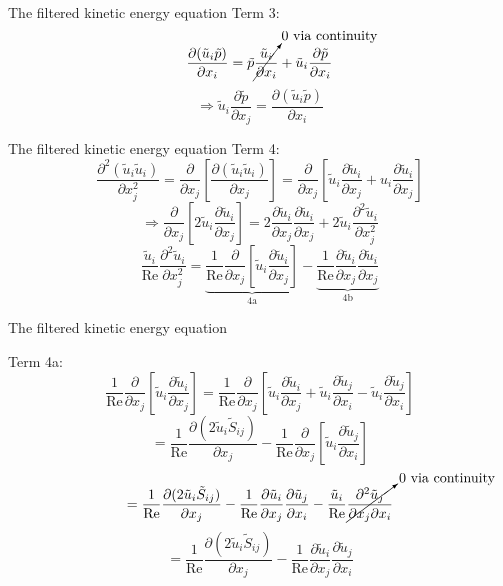 
\begin{frame}{The filtered kinetic energy equation}
Term 3:
$$\frac{\partial (\tilde u_i \tilde p)}{\partial x_i} = \tilde p \cancelto{0 \text{ via continuity}}{\frac{\tilde u_i}{\partial x_i}} + \tilde u_i\frac{\partial \tilde p}{\partial x_i}$$
$$\Rightarrow \boxed{\tilde u_i\frac{\partial \tilde p}{\partial x_j} = \frac{\partial (\tilde u_i \tilde p)}{\partial x_i}}$$
\end{frame}


\begin{frame}{The filtered kinetic energy equation}
Term 4:
$$\frac{\partial^2 (\tilde u_i \tilde u_i)}{\partial x_j^2} = \frac{\partial}{\partial x_j}\left[\frac{\partial (\tilde u_i \tilde u_i)}{\partial x_j}\right] =  \frac{\partial}{\partial x_j}\left[\tilde u_i\frac{\partial \tilde u_i}{\partial x_j} + u_i\frac{\partial \tilde u_i}{\partial x_j}\right]$$
$$\Rightarrow \frac{\partial}{\partial x_j}\left[2\tilde u_i\frac{\partial \tilde u_i}{\partial x_j}\right] = 2\frac{\partial \tilde u_i}{\partial x_j}\frac{\partial \tilde u_i}{\partial x_j} + 2 \tilde u_i \frac{\partial^2 \tilde u_i}{\partial x_j^2}$$
$$\frac{\tilde u_i}{\text{Re}} \frac{\partial^2 \tilde u_i}{\partial x_j^{2}} = \underbrace{\frac{1}{\text{Re}} \frac{\partial}{\partial x_j}\left[\tilde u_i\frac{\partial \tilde u_i}{\partial x_j}\right]}_{\text{4a}} - \underbrace{\frac{1}{\text{Re}}\frac{\partial \tilde u_i}{\partial x_j}\frac{\partial \tilde u_i}{\partial x_j}}_{\text{4b}}$$
\end{frame}


\begin{frame}{The filtered kinetic energy equation}

Term 4a:
$$\frac{1}{\text{Re}}\frac{\partial}{\partial x_j}\left[\tilde u_i\frac{\partial \tilde u_i}{\partial x_j}\right] = \frac{1}{\text{Re}}\frac{\partial}{\partial x_j}\left[\tilde u_i\frac{\partial \tilde u_i}{\partial x_j} + \tilde u_i\frac{\partial \tilde u_j}{\partial x_i} - \tilde u_i\frac{\partial \tilde u_j}{\partial x_i}\right]$$
$$= \frac{1}{\text{Re}}\frac{\partial (2\tilde u_i \tilde S_{ij})}{\partial x_j} - \frac{1}{\text{Re}}\frac{\partial}{\partial x_j} \left[\tilde u_i\frac{\partial \tilde u_j}{\partial x_i}\right]$$
$$=\frac{1}{\text{Re}}\frac{\partial (2\tilde u_i \tilde S_{ij})}{\partial x_j} - \frac{1}{\text{Re}}\frac{\partial \tilde u_i}{\partial x_j}\frac{\partial \tilde u_j}{\partial x_i} -  \frac{\tilde u_i}{\text{Re}}\cancelto{0 \text{ via continuity}}{\frac{\partial^2 \tilde u_j}{\partial x_j \partial x_i}}$$
$$= \frac{1}{\text{Re}}\frac{\partial (2\tilde u_i \tilde S_{ij})}{\partial x_j} - \frac{1}{\text{Re}}\frac{\partial \tilde u_i}{\partial x_j}\frac{\partial \tilde u_j}{\partial x_i}$$
\end{frame}

